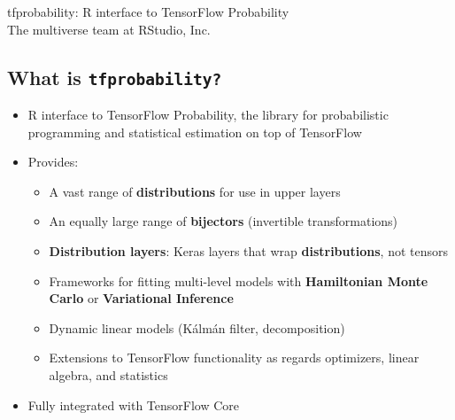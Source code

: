 \documentclass[article,30pt,extrafontsizes]{memoir}
\begin{document}
\begin{topbox}
  \color{titletextcol}
  \vspace{0.5in}
  \Huge{\selectfont tfprobability: R interface to TensorFlow
Probability}  \\[0.3in]  %
  \color{authortextcol} \Large{The multiverse team at RStudio, Inc.} \\[0.2in] %
  \color{affiliationtextcol} \large{} %
  \vspace{1cm}
\end{topbox}
\begin{adjmulticols*}{2}{0.5in}{0.5in}
\normalsize{  %
\color{bodytextcol}
\hypertarget{what-is-tfprobability}{%
\section{\texorpdfstring{What is
\texttt{tfprobability?}}{What is tfprobability?}}\label{what-is-tfprobability}}

\begin{itemize}
\tightlist
\item
  R interface to TensorFlow Probability, the library for probabilistic
  programming and statistical estimation on top of TensorFlow
\item
  Provides:

  \begin{itemize}
  \tightlist
  \item
    A vast range of \textbf{distributions} for use in upper layers
  \item
    An equally large range of \textbf{bijectors} (invertible
    transformations)
  \item
    \textbf{Distribution layers}: Keras layers that wrap
    \textbf{distributions}, not tensors
  \item
    Frameworks for fitting multi-level models with \textbf{Hamiltonian
    Monte Carlo} or \textbf{Variational Inference}
  \item
    Dynamic linear models (Kálmán filter, decomposition)
  \item
    Extensions to TensorFlow functionality as regards optimizers, linear
    algebra, and statistics
  \end{itemize}
\item
  Fully integrated with TensorFlow Core
\end{itemize}

}
\end{adjmulticols*}
\end{document}
